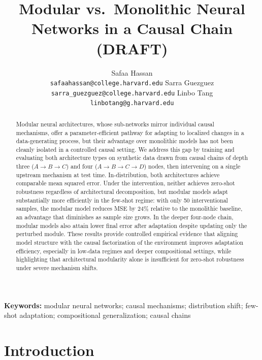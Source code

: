 \documentclass{article}
\title{Modular vs.\ Monolithic Neural Networks in a Causal Chain (DRAFT)}
\author{%
  Safaa Hassan \\
  \texttt{safaahassan@college.harvard.edu} 
  \And
  Sarra Guezguez \\
  \texttt{sarra\_guezguez@college.harvard.edu} 
  \And
  Linbo Tang \\
  \texttt{linbotang@g.harvard.edu} 
}
\begin{document}
\maketitle

% 
% 

\begin{abstract}
Modular neural architectures, whose sub-networks mirror individual causal
mechanisms, offer a parameter-efficient pathway for adapting to localized changes
in a data-generating process, but their advantage over monolithic models has not
been cleanly isolated in a controlled causal setting.
We address this gap by training and evaluating both architecture types on synthetic
data drawn from causal chains of depth three ($A\!\rightarrow\!B\!\rightarrow\!C$)
and four ($A\!\rightarrow\!B\!\rightarrow\!C\!\rightarrow\!D$) nodes, then
intervening on a single upstream mechanism at test time.
In-distribution, both architectures achieve comparable mean squared error.
Under the intervention, neither achieves zero-shot robustness regardless of
architectural decomposition, but modular models adapt substantially more
efficiently in the few-shot regime: with only 50 interventional samples, the
modular model reduces MSE by 24\% relative to the monolithic baseline, an advantage
that diminishes as sample size grows.
In the deeper four-node chain, modular models also attain lower final error after
adaptation despite updating only the perturbed module.
These results provide controlled empirical evidence that aligning model structure
with the causal factorization of the environment improves adaptation efficiency,
especially in low-data regimes and deeper compositional settings, while highlighting
that architectural modularity alone is insufficient for zero-shot robustness under
severe mechanism shifts.
\end{abstract}

\noindent\textbf{Keywords:} modular neural networks; causal mechanisms; distribution shift; few-shot adaptation; compositional generalization; causal chains


\section{Introduction}
\label{sec:intro}
\end{document}
